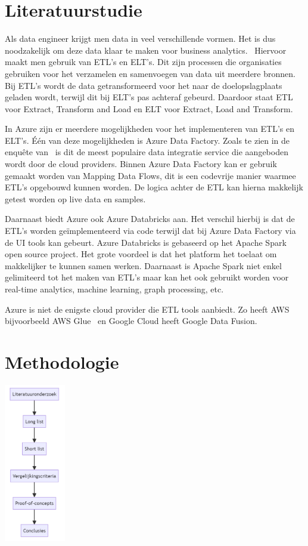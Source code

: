 \section{Literatuurstudie}%
\label{sec:literatuurstudie}

Als data engineer krijgt men data in veel verschillende vormen. Het is dus noodzakelijk om deze data klaar te maken voor business analytics.~\autocite{Kromer2022} Hiervoor maakt men gebruik van ETL's en ELT's. Dit zijn processen die organisaties gebruiken voor het verzamelen en samenvoegen van data uit meerdere bronnen. Bij ETL's wordt de data getransformeerd voor het naar de doelopslagplaats geladen wordt, terwijl dit bij ELT's pas achteraf gebeurd. Daardoor staat ETL voor Extract, Transform and Load en ELT voor Extract, Load and Transform.~\autocite{Bartley2023} 

In Azure zijn er meerdere mogelijkheden voor het implementeren van ETL's en ELT's. Één van deze mogelijkheden is Azure Data Factory. Zoals te zien in de enquête van~\textcite{Sreemathy2021} is dit de meest populaire data integratie service die aangeboden wordt door de cloud providers. Binnen Azure Data Factory kan er gebruik gemaakt worden van Mapping Data Flows, dit is een codevrije manier waarmee ETL's opgebouwd kunnen worden. De logica achter de ETL kan hierna makkelijk getest worden op live data en samples.~\autocite{Kromer2022a} 

Daarnaast biedt Azure ook Azure Databricks aan. Het verschil hierbij is dat de ETL's worden geïmplementeerd via code terwijl dat bij Azure Data Factory via de UI tools kan gebeurt. Azure Databricks is gebaseerd op het Apache Spark open source project. Het grote voordeel is dat het platform het toelaat om makkelijker te kunnen samen werken. Daarnaast is Apache Spark niet enkel gelimiteerd tot het maken van ETL's maar kan het ook gebruikt worden voor real-time analytics, machine learning, graph processing, etc.~\autocite{Etaati2019}

Azure is niet de enigste cloud provider die ETL tools aanbiedt. Zo heeft AWS bijvoorbeeld AWS Glue~\autocite{Khan2024} en Google Cloud heeft Google Data Fusion.~\autocite{Jaiswal2022}

\section{Methodologie}%
\label{sec:methodologie}

\begin{center}
    \includegraphics[width=0.2\textwidth]{graphics/methodologie.png}    
\end{center}

